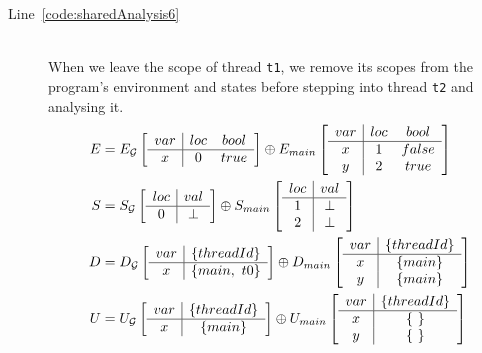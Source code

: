 \begin{description}
	\item[Line~\ref{code:sharedAnalysis6}] \hfill \\
		When we leave the scope of thread \verb$t1$, we remove its scopes from the
		program's environment and states before stepping into thread \verb$t2$ and 
		analysing it.
		\begin{align*}
			E &= E_{\mathcal{G}} \left[
				\begin{array}{c | c c}
					var	& loc	& bool	\\ \hline
					x	& 0		& true
				\end{array}
			\right]
			\oplus
			E_{main} \left[
				\begin{array}{c | c c}
					var	& loc	& bool	\\ \hline
					x	& 1		& false	\\
					y	& 2		& true
				\end{array}
			\right] \\		
			S &= S_{\mathcal{G}} \left[
				\begin{array}{c | c c}
					loc	& val	\\ \hline
					0	& \bot
				\end{array}
			\right]
			\oplus
			S_{main} \left[
				\begin{array}{c | c c}
					loc	& val	\\ \hline
					1	& \bot	\\
					2	& \bot
				\end{array}
			\right] \\
			D &= D_{\mathcal{G}} \left[
				\begin{array}{c | c}
					var	& \lbrace threadId \rbrace	\\ \hline
					x	& \lbrace main,~t0 \rbrace
				\end{array}
			\right]
			\oplus
			D_{main} \left[
				\begin{array}{c | c c}
					var	& \lbrace threadId \rbrace	\\ \hline
					x	& \lbrace main \rbrace		\\
					y	& \lbrace main \rbrace
				\end{array}
			\right] \\
			U &= U_{\mathcal{G}} \left[
				\begin{array}{c | c}
					var	& \lbrace threadId \rbrace	\\ \hline
					x	& \lbrace main \rbrace
				\end{array}
			\right]	
			\oplus
			U_{main} \left[
				\begin{array}{c | c c}
					var	& \lbrace threadId \rbrace	\\ \hline
					x	& \lbrace ~ \rbrace			\\
					y	& \lbrace ~ \rbrace
				\end{array}
			\right]
		\end{align*}
		

\end{description}

